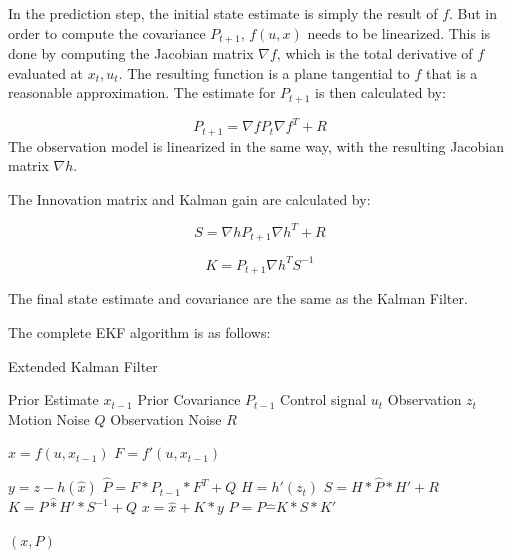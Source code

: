 \documentclass[12pt]{report}
\begin{document}
In the prediction step, the initial state estimate is simply the
result of $f$. But in order to compute the covariance $P_{t+1}$,
$f(u,x)$ needs to be linearized. This is done by computing the
Jacobian matrix $\nabla f$, which is the total derivative of $f$
evaluated at $x_t, u_t$. The resulting function is a plane tangential
to $f$ that is a reasonable approximation. The estimate for $P_{t+1}$
is then calculated by:

\begin{equation}\label{ekf_cov}
P_{t+1} = \nabla fP_t \nabla f^T + R
\end{equation}
The observation model is linearized in the same way, with the
resulting Jacobian matrix $\nabla h$.

The Innovation matrix and Kalman gain are calculated by:

\begin{equation}\label{ekf_S}
S = \nabla h P_{t+1} \nabla h^T + R
\end{equation}

\begin{equation}\label{ekf_K}
K = P_{t+1} \nabla h^TS^{-1}
\end{equation}

The final state estimate and covariance are the same as the Kalman
Filter.

The complete EKF algorithm is as follows:

\begin{algorithm}     
\caption{Extended Kalman Filter}
\label{EKF}   
\begin{algorithmic}         
    \Require Prior Estimate $x_{t-1}$ 
    \Require Prior Covariance $P_{t-1}$
    \Require Control signal $u_t$ 
    \Require Observation $z_t$
    \Require Motion Noise $Q$
    \Require Observation Noise $R$

    \State $\hat{x} = f(u, x_{t-1})$
    \State $F = f'(u,x_{t-1})$

    \State $y = z - h(\hat{x})$
    \State $\hat{P} = F * P_{t-1} * F^T + Q$
    \State $H = h'(z_t)$
    \State $S = H * \hat{P} * H' + R$
    \State $K = P\hat * H' * S^{-1} +Q$  
    \State $x = \hat{x} + K * y$
    \State $P = P\hat - K * S * K'$

\State\Return $(x, P)$
\end{algorithmic}
\end{algorithm}
\end{document}
